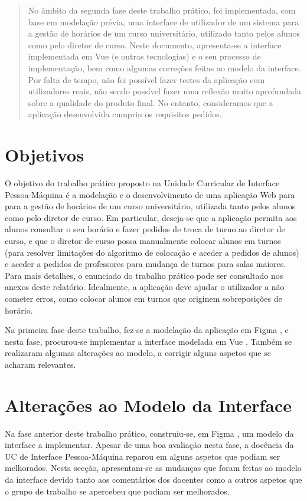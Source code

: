 \documentclass[12pt, a4paper]{article}
\begin{document}
\begin{abstract}
    \noindent
    No âmbito da segunda fase deste trabalho prático, foi implementada, com base em modelação
    prévia, uma interface de utilizador de um sistema para a gestão de horários de um curso
    universitário, utilizado tanto pelos alunos como pelo diretor de curso. Neste documento,
    apresenta-se a interface implementada em Vue \cite{vue} (e outras tecnologias) e o seu processo
    de implementação, bem como algumas correções feitas ao modelo da interface. Por falta de tempo,
    não foi possível fazer testes da aplicação com utilizadores reais, não sendo possível fazer uma
    reflexão muito aprofundada sobre a qualidade do produto final. No entanto, consideramos que a
    aplicação desenvolvida cumpriu os requisitos pedidos.
\end{abstract}

\section{Objetivos}

O objetivo do trabalho prático proposto na Unidade Curricular de Interface Pessoa-Máquina é a
modelação e o desenvolvimento de uma aplicação Web para para a gestão de horários de um curso
universitário, utilizada tanto pelos alunos como pelo diretor de curso. Em particular, deseja-se que
a aplicação permita aos alunos consultar o seu horário e fazer pedidos de troca de turno ao diretor
de curso, e que o diretor de curso possa manualmente colocar alunos em turnos (para resolver
limitações do algoritmo de colocação e aceder a pedidos de alunos) e aceder a pedidos de professores
para mudança de turnos para salas maiores. Para mais detalhes, o enunciado do trabalho prático pode
ser consultado nos anexos deste relatório. Idealmente, a aplicação deve ajudar o utilizador a não
cometer erros, como colocar alunos em turnos que originem sobreposições de horário.

Na primeira fase deste trabalho, fez-se a modelação da aplicação em Figma \cite{figma}, e nesta
fase, procurou-se implementar a interface modelada em Vue \cite{vue}. Também se realizaram algumas
alterações ao modelo, a corrigir alguns aspetos que se acharam relevantes.

\section{Alterações ao Modelo da Interface}

Na fase anterior deste trabalho prático, construiu-se, em Figma \cite{figma}, um modelo da interface
a implementar. Apesar de uma boa avaliação nesta fase, a docência da UC de Interface Pessoa-Máquina
reparou em alguns aspetos que podiam ser melhorados. Nesta secção, apresentam-se as mudanças que
foram feitas ao modelo da interface devido tanto aos comentários dos docentes como a outros aspetos
que o grupo de trabalho se apercebeu que podiam ser melhorados.
\end{document}
